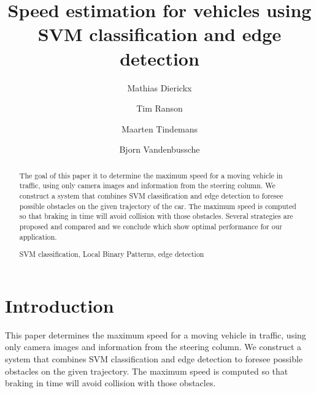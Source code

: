 \documentclass[runningheads,a4paper]{llncs}
\newcommand{\keywords}[1]{\par\addvspace\baselineskip
\newcommand\fnumber{\mathop{\mbox{$F$-$score$}}}
\noindent\keywordname\enspace\ignorespaces#1}
\begin{document}
\mainmatter  %

\title{Speed estimation for vehicles using \\SVM classification and edge detection}


%
%
\author{Mathias Dierickx\and Tim Ranson\and Maarten Tindemans\and Bjorn Vandenbussche}
%


\maketitle

\begin{abstract}
The goal of this paper it to determine the maximum speed for a moving vehicle in traffic, using only camera images and information from the steering column. We construct a system that combines SVM classification and edge detection to foresee possible obstacles on the given trajectory of the car. The maximum speed is computed so that braking in time will avoid collision with those obstacles. Several strategies are proposed and compared and we conclude which show optimal performance for our application.

\keywords{SVM classification, Local Binary Patterns, edge detection}
\end{abstract}


\section{Introduction}
This paper determines the maximum speed for a moving vehicle in traffic, using only camera images and information from the steering column. We construct a system that combines SVM classification and edge detection to foresee possible obstacles on the given trajectory. The maximum speed is computed so that braking in time will avoid collision with those obstacles.
\end{document}
